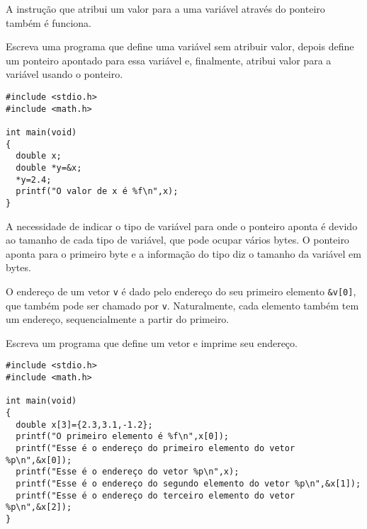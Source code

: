 A instrução que atribui um valor para a uma variável através do ponteiro também é funciona.
\begin{ex}
Escreva uma programa que define uma variável sem atribuir valor, depois define um ponteiro apontado para essa variável e, finalmente, atribui valor para a variável usando o ponteiro.
\end{ex}
\begin{verbatim}
#include <stdio.h>
#include <math.h>

int main(void)
{
  double x;
  double *y=&x;
  *y=2.4;
  printf("O valor de x é %f\n",x);
}
\end{verbatim}

A necessidade de indicar o tipo de variável para onde o ponteiro aponta é devido ao tamanho de cada tipo de variável, que pode ocupar vários bytes. O ponteiro aponta para o primeiro byte e a informação do tipo diz o tamanho da variável em bytes.

O endereço de um vetor \verb|v| é dado pelo endereço do seu primeiro elemento \verb|&v[0]|, que também pode ser chamado por \verb|v|. Naturalmente, cada elemento também tem um endereço, sequencialmente a partir do primeiro. 
\begin{ex}
Escreva um programa que define um vetor e imprime seu endereço.
\end{ex}
\begin{verbatim}
#include <stdio.h>
#include <math.h>

int main(void)
{
  double x[3]={2.3,3.1,-1.2};
  printf("O primeiro elemento é %f\n",x[0]);
  printf("Esse é o endereço do primeiro elemento do vetor %p\n",&x[0]);
  printf("Esse é o endereço do vetor %p\n",x);
  printf("Esse é o endereço do segundo elemento do vetor %p\n",&x[1]);
  printf("Esse é o endereço do terceiro elemento do vetor %p\n",&x[2]);  
}
\end{verbatim}

